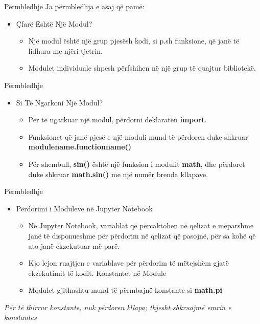 \documentclass[
  ignorenonframetext,
]{beamer}
\begin{document}
\begin{frame}{Përmbledhje}
\protect\hypertarget{puxebrmbledhje}{}
Ja përmbledhja e asaj që pamë:

\begin{itemize}
\item
  Çfarë Është Një Modul?

  \begin{itemize}
  \item
    Një modul është një grup pjesësh kodi, si p.sh funksione, që janë të
    lidhura me njëri-tjetrin.
  \item
    Modulet individuale shpesh përfshihen në një grup të quajtur
    bibliotekë.
  \end{itemize}
\end{itemize}
\end{frame}

\begin{frame}{Përmbledhje}
\protect\hypertarget{puxebrmbledhje-1}{}
\begin{itemize}
\item
  Si Të Ngarkoni Një Modul?

  \begin{itemize}
  \item
    Për të ngarkuar një modul, përdorni deklaratën \textbf{import}.
  \item
    Funksionet që janë pjesë e një moduli mund të përdoren duke shkruar
    \textbf{modulename.functionname()}
  \item
    Për shembull, \textbf{sin()} është një funksion i modulit
    \textbf{math}, dhe përdoret duke shkruar \textbf{math.sin()} me një
    numër brenda kllapave.
  \end{itemize}
\end{itemize}
\end{frame}

\begin{frame}{Përmbledhje}
\protect\hypertarget{puxebrmbledhje-2}{}
\begin{itemize}
\item
  Përdorimi i Moduleve në Jupyter Notebook

  \begin{itemize}
  \item
    Në Jupyter Notebook, variablat që përcaktohen në qelizat e mëparshme
    janë të disponueshme për përdorim në qelizat që pasojnë, për sa kohë
    që ato janë ekzekutuar më parë.
  \item
    Kjo lejon ruajtjen e variablave për përdorim të mëtejshëm gjatë
    ekzekutimit të kodit. Konstantet në Module
  \item
    Modulet gjithashtu mund të përmbajnë konstante si \textbf{math.pi}
  \end{itemize}
\end{itemize}

\emph{Për të thirrur konstante, nuk përdoren kllapa; thjesht shkruajmë
emrin e konstantes}
\end{frame}
\end{document}
